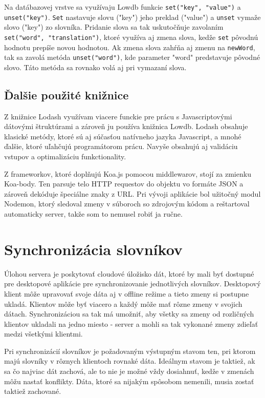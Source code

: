 \documentclass[
  digital, %
  table,   %
  lof,     %
  lot,     %
]{fithesis3}
\begin{document}
Na datábazovej vrstve sa využívaju Lowdb funkcie \texttt{set("key", "value")} a \texttt{unset("key")}. \texttt{Set} nastavuje slovu ("key") jeho preklad ("value") a \texttt{unset} vymaže slovo ("key") zo slovníka. Pridanie slova sa tak uskutočňuje zavolaním \texttt{set("word", "translation")}, ktoré využíva aj zmena slova, kedže \texttt{set} pôvodnú hodnotu prepíše novou hodnotou. Ak zmena slova zahŕňa aj zmenu na \texttt{newWord}, tak sa zavolá metóda \texttt{unset("word")}, kde parameter "word" predstavuje pôvodné slovo. Táto metóda sa rovnako volá aj pri vymazaní slova.

\subsection{Ďalšie použité knižnice}
Z knižnice Lodash využívam viacere funckie pre prácu s Javascriptovými dátovými štruktúrami a zároveň ju používa knižnica Lowdb. Lodash obsahuje klasické metódy, ktoré sú aj súčasťou natívneho jazyka Javascript, a mnohé ďalšie, ktoré uľahčujú programátorom prácu. Navyše obsahujú aj validáciu vstupov a optimalizáciu funkctionality.

Z frameworkov, ktoré doplňujú Koa.js pomocou middlewarov, stojí za zmienku Koa-body. Ten parsuje telo HTTP requestov do objektu vo formáte JSON a zároveň dekóduje špeciálne znaky z URL. Pri vývoji aplikácie bol užitočný modul Nodemon, ktorý sledoval zmeny v súboroch so zdrojovým kódom a reštartoval automaticky server, takže som to nemusel robiť ja ručne. 


\section{Synchronizácia slovníkov}
Úlohou servera je poskytovať cloudové úložisko dát, ktoré by mali byť dostupné pre desktopové aplikácie pre synchronizovanie jednotlivých slovníkov. Desktopový klient môže upravovať svoje dáta aj v offline režime a tieto zmeny si postupne ukladá. Klientov môže byť viacero a každý môže mať rôzne zmeny v svojich dátach. Synchronizáciou sa tak má umožniť, aby všetky sa zmeny od rozličných klientov ukladali na jedno miesto - server a mohli sa tak vykonané zmeny zdieľať medzi všetkými klientmi.

Pri synchronizácií slovníkov je požadovaným výstupným stavom ten, pri ktorom majú slovníky v rôznych klientoch rovnaké dáta. Ideálnym stavom je taktiež, ak sa čo najviac dát zachová, ale to nie je možné vždy dosiahnuť, kedže v zmenách môžu nastať konflikty. Dáta, ktoré sa nijakým spôsobom nemenili, musia zostať taktiež zachované.
\end{document}
